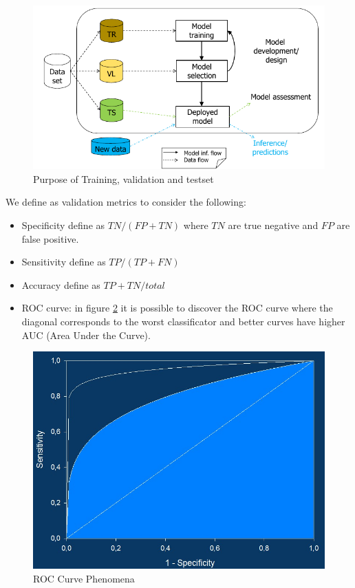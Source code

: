 \begin{description}
                        \begin{figure}
                            \caption{Purpose of Training, validation and testset}
                            \label{img:dataset}
                            \includegraphics[width=\textwidth]{images/dataSet}
                        \end{figure}
			We define as validation metrics to consider the following:
			\begin{itemize}
			    \item Specificity define as $TN / (FP + TN)$ where $TN$ are true negative and $FP$ are false positive.
			    \item Sensitivity define as $TP / (TP + FN)$
			    \item Accuracy define as $TP + TN / total$
			    \item ROC curve: in figure \ref{img:roc} it is possible to discover the ROC curve where the diagonal corresponds to the 
				  worst classificator and better curves have higher AUC (Area Under the Curve).
			\end{itemize}

			\begin{figure}
			    \caption{ROC Curve Phenomena}
			    \label{img:roc}
			    \includegraphics[width=\textwidth]{images/rocCurve}
			\end{figure}

\end{description}
